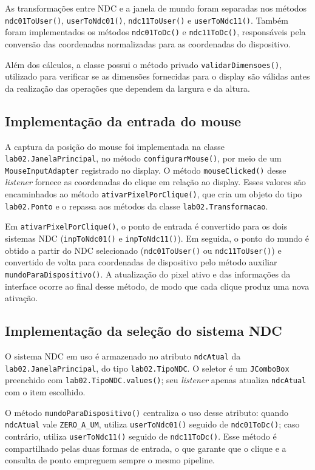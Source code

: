 As transformações entre NDC e a janela de mundo foram separadas nos métodos \texttt{ndc01ToUser()}, \texttt{userToNdc01()}, \texttt{ndc11ToUser()} e \texttt{userToNdc11()}. Também foram implementados os métodos \texttt{ndc01ToDc()} e \texttt{ndc11ToDc()}, responsáveis pela conversão das coordenadas normalizadas para as coordenadas do dispositivo.

Além dos cálculos, a classe possui o método privado \texttt{validarDimensoes()}, utilizado para verificar se as dimensões fornecidas para o display são válidas antes da realização das operações que dependem da largura e da altura.

\subsection{Implementação da entrada do mouse}
A captura da posição do mouse foi implementada na classe \texttt{lab02.JanelaPrincipal}, no método \texttt{configurarMouse()}, por meio de um \texttt{MouseInputAdapter} registrado no display. O método \texttt{mouseClicked()} desse \textit{listener} fornece as coordenadas do clique em relação ao display. Esses valores são encaminhados ao método \texttt{ativarPixelPorClique()}, que cria um objeto do tipo \texttt{lab02.Ponto} e o repassa aos métodos da classe \texttt{lab02.Transformacao}.

Em \texttt{ativarPixelPorClique()}, o ponto de entrada é convertido para os dois sistemas NDC (\texttt{inpToNdc01()} e \texttt{inpToNdc11()}). Em seguida, o ponto do mundo é obtido a partir do NDC selecionado (\texttt{ndc01ToUser()} ou \texttt{ndc11ToUser()}) e convertido de volta para coordenadas de dispositivo pelo método auxiliar \texttt{mundoParaDispositivo()}. A atualização do pixel ativo e das informações da interface ocorre ao final desse método, de modo que cada clique produz uma nova ativação.

\subsection{Implementação da seleção do sistema NDC}
O sistema NDC em uso é armazenado no atributo \texttt{ndcAtual} da \texttt{lab02.JanelaPrincipal}, do tipo \texttt{lab02.TipoNDC}. O seletor é um \texttt{JComboBox} preenchido com \texttt{lab02.TipoNDC.values()}; seu \textit{listener} apenas atualiza \texttt{ndcAtual} com o item escolhido.

O método \texttt{mundoParaDispositivo()} centraliza o uso desse atributo: quando \texttt{ndcAtual} vale \texttt{ZERO\_A\_UM}, utiliza \texttt{userToNdc01()} seguido de \texttt{ndc01ToDc()}; caso contrário, utiliza \texttt{userToNdc11()} seguido de \texttt{ndc11ToDc()}. Esse método é compartilhado pelas duas formas de entrada, o que garante que o clique e a consulta de ponto empreguem sempre o mesmo pipeline.

